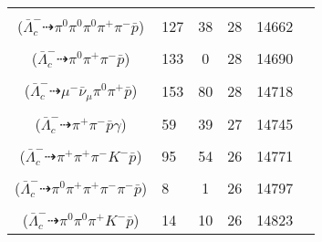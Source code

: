 \documentclass[landscape]{article}
\newcounter{rownumbers}
\newcommand\rn{\stepcounter{rownumbers}\arabic{rownumbers}}
\newcommand{\EOL}{\\} %
\newcommand{\topoTags}[1]{#1} %
\begin{document}
\begin{longtable}{clcccc}
\rn & \makecell[l]{ $ 
\bar{\Lambda}_{c}^{-} \rightarrow \pi^{+} \pi^{-} K^{0} \bar{p} ,
K^{0} \rightarrow K_{L}^{0} ,
K_{L}^{0} \rightarrow \pi^{0} \pi^{0} \pi^{0} 
$ \\ ($
\bar{\Lambda}_{c}^{-} \dashrightarrow \pi^{0} \pi^{0} \pi^{0} \pi^{+} \pi^{-} \bar{p} 
$) } & \topoTags{127 & 38 & }28 & 14662 \EOL

\rn & \makecell[l]{ $ 
\bar{\Lambda}_{c}^{-} \rightarrow \rho^{+} \bar{\Delta}^{--} ,
\rho^{+} \rightarrow \pi^{0} \pi^{+} ,
\bar{\Delta}^{--} \rightarrow \pi^{-} \bar{p} 
$ \\ ($
\bar{\Lambda}_{c}^{-} \dashrightarrow \pi^{0} \pi^{+} \pi^{-} \bar{p} 
$) } & \topoTags{133 & 0 & }28 & 14690 \EOL

\rn & \makecell[l]{ $ 
\bar{\Lambda}_{c}^{-} \rightarrow \mu^{-} \bar{\nu}_{\mu} \pi^{+} \bar{\Sigma}^{-} ,
\bar{\Sigma}^{-} \rightarrow \pi^{0} \bar{p} 
$ \\ ($
\bar{\Lambda}_{c}^{-} \dashrightarrow \mu^{-} \bar{\nu}_{\mu} \pi^{0} \pi^{+} \bar{p} 
$) } & \topoTags{153 & 80 & }28 & 14718 \EOL

\rn & \makecell[l]{ $ 
\bar{\Lambda}_{c}^{-} \rightarrow \pi^{-} \bar{\Sigma}^{0} ,
\bar{\Sigma}^{0} \rightarrow \bar{\Lambda} \gamma ,
\bar{\Lambda} \rightarrow \pi^{+} \bar{p} 
$ \\ ($
\bar{\Lambda}_{c}^{-} \dashrightarrow \pi^{+} \pi^{-} \bar{p} \gamma 
$) } & \topoTags{59 & 39 & }27 & 14745 \EOL

\rn & \makecell[l]{ $ 
\bar{\Lambda}_{c}^{-} \rightarrow K^{0} K^{-} \bar{\Lambda} ,
K^{0} \rightarrow K_{S}^{0} ,
\bar{\Lambda} \rightarrow \pi^{+} \bar{p} ,
K_{S}^{0} \rightarrow \pi^{+} \pi^{-} 
$ \\ ($
\bar{\Lambda}_{c}^{-} \dashrightarrow \pi^{+} \pi^{+} \pi^{-} K^{-} \bar{p} 
$) } & \topoTags{95 & 54 & }26 & 14771 \EOL

\rn & \makecell[l]{ $ 
\bar{\Lambda}_{c}^{-} \rightarrow \eta K^{0} \bar{p} ,
\eta \rightarrow \pi^{0} \pi^{+} \pi^{-} ,
K^{0} \rightarrow K_{S}^{0} ,
K_{S}^{0} \rightarrow \pi^{+} \pi^{-} 
$ \\ ($
\bar{\Lambda}_{c}^{-} \dashrightarrow \pi^{0} \pi^{+} \pi^{+} \pi^{-} \pi^{-} \bar{p} 
$) } & \topoTags{8 & 1 & }26 & 14797 \EOL

\rn & \makecell[l]{ $ 
\bar{\Lambda}_{c}^{-} \rightarrow \pi^{0} K^{-} \bar{\Xi}^{0} ,
\bar{\Xi}^{0} \rightarrow \pi^{0} \bar{\Lambda} ,
\bar{\Lambda} \rightarrow \pi^{+} \bar{p} 
$ \\ ($
\bar{\Lambda}_{c}^{-} \dashrightarrow \pi^{0} \pi^{0} \pi^{+} K^{-} \bar{p} 
$) } & \topoTags{14 & 10 & }26 & 14823 \EOL


\end{longtable}
\end{document}
